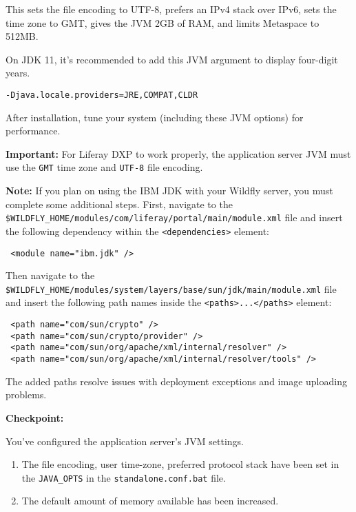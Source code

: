 This sets the file encoding to UTF-8, prefers an IPv4 stack over IPv6,
sets the time zone to GMT, gives the JVM 2GB of RAM, and limits
Metaspace to 512MB.

On JDK 11, it's recommended to add this JVM argument to display
four-digit years.

\begin{verbatim}
-Djava.locale.providers=JRE,COMPAT,CLDR
\end{verbatim}

After installation, tune your system (including these JVM options) for
performance.

\noindent\hrulefill

\textbf{Important:} For Liferay DXP to work properly, the application
server JVM must use the \texttt{GMT} time zone and \texttt{UTF-8} file
encoding.

\noindent\hrulefill

\noindent\hrulefill

\textbf{Note:} If you plan on using the IBM JDK with your Wildfly
server, you must complete some additional steps. First, navigate to the
\texttt{\$WILDFLY\_HOME/modules/com/liferay/portal/main/module.xml} file
and insert the following dependency within the
\texttt{\textless{}dependencies\textgreater{}} element:

\begin{verbatim}
 <module name="ibm.jdk" />
\end{verbatim}

Then navigate to the
\texttt{\$WILDFLY\_HOME/modules/system/layers/base/sun/jdk/main/module.xml}
file and insert the following path names inside the
\texttt{\textless{}paths\textgreater{}...\textless{}/paths\textgreater{}}
element:

\begin{verbatim}
 <path name="com/sun/crypto" />
 <path name="com/sun/crypto/provider" />
 <path name="com/sun/org/apache/xml/internal/resolver" />
 <path name="com/sun/org/apache/xml/internal/resolver/tools" />
\end{verbatim}

The added paths resolve issues with deployment exceptions and image
uploading problems.

\noindent\hrulefill

\textbf{Checkpoint:}

You've configured the application server's JVM settings.

\begin{enumerate}
\def\labelenumi{\arabic{enumi}.}
\item
  The file encoding, user time-zone, preferred protocol stack have been
  set in the \texttt{JAVA\_OPTS} in the \texttt{standalone.conf.bat}
  file.
\item
  The default amount of memory available has been increased.
\end{enumerate}

